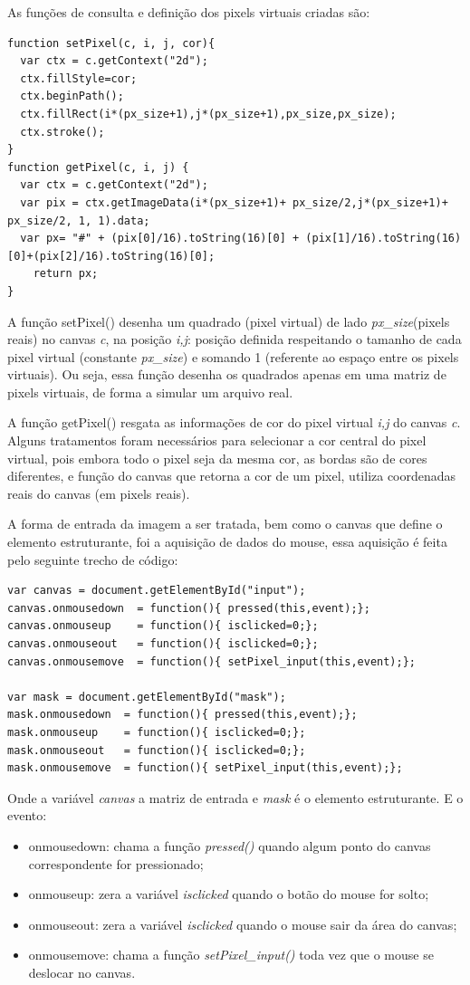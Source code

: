 \documentclass[conference,harvard,brazil,english]{sbatex}
\begin{document}
As funções de consulta e definição dos pixels virtuais criadas são:
\begin{lstlisting}
function setPixel(c, i, j, cor){
  var ctx = c.getContext("2d"); 
  ctx.fillStyle=cor;
  ctx.beginPath();
  ctx.fillRect(i*(px_size+1),j*(px_size+1),px_size,px_size);
  ctx.stroke();
}
function getPixel(c, i, j) {
  var ctx = c.getContext("2d");
  var pix = ctx.getImageData(i*(px_size+1)+ px_size/2,j*(px_size+1)+ px_size/2, 1, 1).data;  
  var px= "#" + (pix[0]/16).toString(16)[0] + (pix[1]/16).toString(16)[0]+(pix[2]/16).toString(16)[0];
    return px;
}
\end{lstlisting}
A função setPixel() desenha um quadrado (pixel virtual) de lado \textit{px\_size}(pixels reais)  no canvas \textit{c}, na posição \textit{i,j}: posição definida respeitando o tamanho de cada pixel virtual (constante \textit{px\_size}) e somando 1 (referente ao espaço entre os pixels virtuais).
Ou seja, essa função desenha os quadrados apenas em uma matriz de pixels virtuais, de forma a simular um arquivo real.

A função getPixel() resgata as informações de cor do pixel virtual \textit{i,j} do canvas \textit{c}. Alguns tratamentos foram necessários para selecionar a cor central do pixel virtual, pois embora todo o pixel seja da mesma cor, as bordas são de cores diferentes, e função do canvas que retorna a cor de um pixel, utiliza coordenadas reais do canvas (em pixels reais).

A forma de entrada da imagem a ser tratada, bem como o canvas que define o elemento estruturante, foi a aquisição de dados do mouse, essa aquisição é feita pelo seguinte trecho de código:

\begin{lstlisting}
var canvas = document.getElementById("input");
canvas.onmousedown  = function(){ pressed(this,event);};
canvas.onmouseup    = function(){ isclicked=0;};
canvas.onmouseout   = function(){ isclicked=0;};
canvas.onmousemove  = function(){ setPixel_input(this,event);};

var mask = document.getElementById("mask");
mask.onmousedown  = function(){ pressed(this,event);};
mask.onmouseup    = function(){ isclicked=0;};
mask.onmouseout   = function(){ isclicked=0;};
mask.onmousemove  = function(){ setPixel_input(this,event);};
\end{lstlisting}
Onde a variável \textit{canvas} a matriz de entrada e \textit{mask} é o elemento estruturante.
E o evento: 
\begin{itemize}
\item onmousedown: chama a função \textit{pressed()} quando algum ponto do canvas correspondente for pressionado;
\item onmouseup: zera a variável \textit{isclicked} quando o botão do mouse for solto;
\item onmouseout: zera a variável \textit{isclicked} quando o mouse sair da área do canvas;
\item onmousemove: chama a função \textit{setPixel\_input()} toda vez que o mouse se deslocar no canvas.
\end{itemize}
\end{document}

